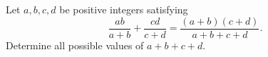 Let $a, b, c, d$ be positive integers satisfying
\[
\frac{ab}{a+b} + \frac{cd}{c+d} = \frac{(a+b)(c+d)}{a+b+c+d}.
\]
Determine all possible values of $a + b + c + d$.
